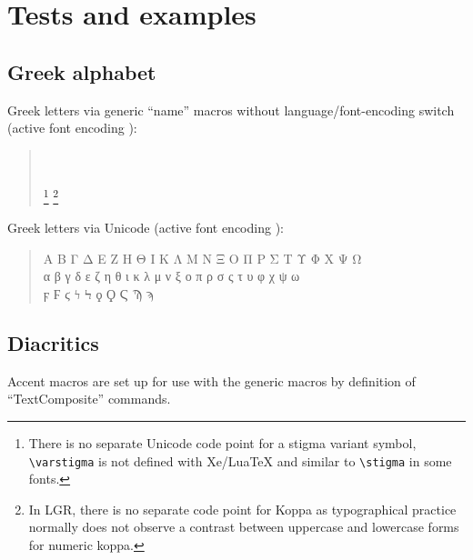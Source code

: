 \documentclass{article}
\begin{document}
\section{Tests and examples}

\subsection{Greek alphabet}

Greek letters via generic ``name'' macros without language/font-encoding
switch (active font encoding \encodingdefault):

\begin{quote}
  \Alpha{} \Beta{} \Gamma{} \Delta{} \Epsilon{} \Zeta{} \Eta{} \Theta{}
  \Iota{} \Kappa{} \Lambda{} \Mu{} \Nu{} \Xi{} \Omicron{} \Pi{} \Rho{}
  \Sigma{} \Tau{} \Upsilon{} \Phi{} \Chi{} \Psi{} \Omega{}
  \\
  \alpha{} \beta{} \gamma{} \delta{} \epsilon{} \zeta{} \eta{} \theta{}
  \iota{} \kappa{} \lambda{} \mu{} \nu{} \xi{} \omicron{} \pi{} \rho{}
  \sigma{} \varsigma{} \tau{} \upsilon{} \phi{} \chi{} \psi{} \omega{}
  \\
  \digamma{} \Digamma{} \stigma{} \varstigma{}%
    \footnote{There is no separate Unicode code point for a stigma variant
      symbol, \texttt{\textbackslash varstigma} is not defined with
      Xe/LuaTeX and similar to \texttt{\textbackslash stigma} in some fonts.}
  \koppa{} \Koppa{}%
    \footnote{In LGR, there is no separate code point for Koppa as
      typographical practice normally does not observe a
      contrast between uppercase and lowercase forms for numeric koppa.}
  \qoppa{} \Qoppa{} \Stigma{} \Sampi{} \sampi{}
\end{quote}
%
Greek letters via Unicode (active font encoding \encodingdefault):

\begin{quote}
  Α Β Γ Δ Ε Ζ Η Θ Ι Κ Λ Μ Ν Ξ Ο Π Ρ Σ Τ Υ Φ Χ Ψ Ω\\
  α β γ δ ε ζ η θ ι κ λ μ ν ξ ο π ρ σ ς τ υ φ χ ψ ω\\
  ϝ Ϝ ϛ ϟ Ϟ ϙ Ϙ Ϛ Ϡ ϡ
\end{quote}

\subsection{Diacritics}

Accent macros are set up for use with the generic macros by definition of
``TextComposite'' commands.
\end{document}
